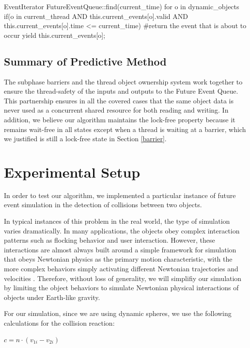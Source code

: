 \documentclass[conference]{IEEEtran}
\begin{document}
\begin{verbatimtab}[3]
EventIterator FutureEventQueue::find(current_time)
{
   for o in dynamic_objects
   {
      if(o in current_thread AND this.current_events[o].valid AND this.current_events[o].time <= current_time)
      #return the event that is about to occur
	yield this.current_events[o];
   }
}
\end{verbatimtab}

\subsection{Summary of Predictive Method}
	The subphase barriers and the thread object ownership system work together to ensure the thread-safety of the inputs and outputs to the Future Event Queue.
This partnership ensures in all the covered cases that the same object data is never used as a concurrent shared resource for both reading and writing.  In addition, we believe our algorithm maintains
the lock-free property because it remains wait-free in all states except when a thread is waiting at a barrier, which we justified is still a lock-free state in Section \ref{barrier}.

\section{Experimental Setup}%

In order to test our algorithm, we implemented a particular instance of future event simulation in the detection of collisions between two objects.

In typical instances of this problem in the real world, the type of simulation varies dramatically. In many applications, the objects obey complex interaction patterns such as flocking behavior and user interaction.  However, these interactions are almost always built around a simple framework for simulation that obeys Newtonian physics as the primary motion characteristic, with the more complex
behaviors simply activating different Newtonian trajectories and velocities \cite{Jadbabaie02coordinationof}.  Therefore, without loss of generality, we will simplifiy our simulation by limiting the object behaviors to simulate Newtonian physical interactions of objects under Earth-like gravity.

For our simulation, since we are using dynamic spheres, we use the following calculations for the collision reaction\cite{wheatchex}:

\begin{math}
c = n \cdot (v_{1i} - v_{2i})
\end{math}
\end{document}
